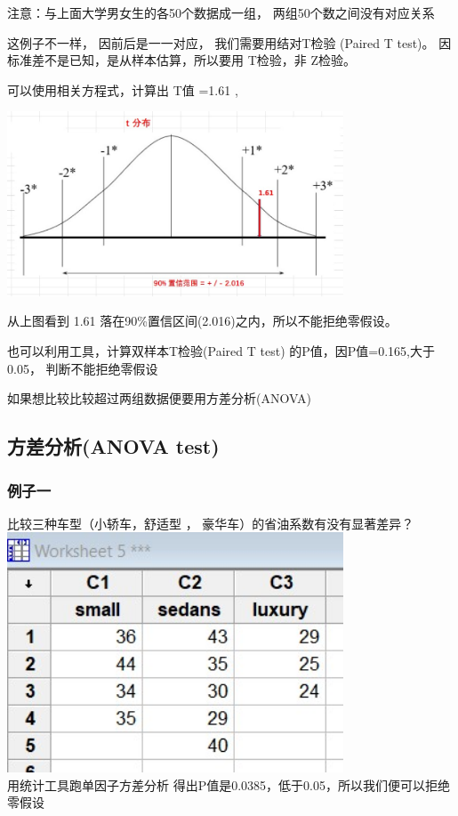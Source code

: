 注意：与上面大学男女生的各50个数据成一组， 两组50个数之间没有对应关系

这例子不一样， 因前后是一一对应， 我们需要用结对T检验 (Paired T test)。
因标准差不是已知，是从样本估算，所以要用 T检验，非 Z检验。

可以使用相关方程式，计算出 T值 =1.61 ,


\includegraphics[width=10cm]{CholesterolEg2022-07-23_195121.jpg}

从上图看到 1.61 落在90\%置信区间(2.016)之内，所以不能拒绝零假设。

也可以利用工具，计算双样本T检验(Paired T test)
的P值，因P值=0.165,大于0.05， 判断不能拒绝零假设

如果想比较比较超过两组数据便要用方差分析(ANOVA)

\hypertarget{ux65b9ux5deeux5206ux67901-anova-test}{%
\subsection{方差分析(ANOVA
test)}\label{ux65b9ux5deeux5206ux67901-anova-test}}

\hypertarget{ux65b9ux5deeux5206ux67902-anova-test}{%
\subsubsection{例子一}\label{ux65b9ux5deeux5206ux67902-anova-test}}

比较三种车型（小轿车，舒适型 ， 豪华车）的省油系数有没有显著差异？\\
\includegraphics[width=10cm]{5anovaDataScreenshot_2022-07-24_105955.jpg}\\
用统计工具跑单因子方差分析
得出P值是0.0385，低于0.05，所以我们便可以拒绝零假设 

